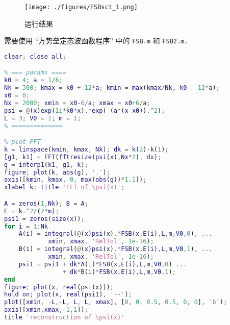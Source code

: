 
\begin{issues}
\issueDraft
{}
\end{issues}


\begin{figure}[ht]
\centering
\texttt{[image: ./figures/FSBsct\_1.png]}
\caption{运行结果} \label{FSBsct_fig1}
\end{figure}

需要使用 “方势垒定态波函数程序” 中的 \verb|FSB.m| 和 \verb|FSB2.m|．
\begin{lstlisting}[language=matlab, caption=FSBsct.m]
% 使用类 sin，cos 基底
clear; close all;

% === params ====
k0 = 4; a = 1/6;
Nk = 300; kmax = k0 + 12*a; kmin = max(kmax/Nk, k0 - 12*a);
x0 = 0;
Nx = 2000; xmin = x0-6/a; xmax = x0+6/a;
psi = @(x)exp(1i*k0*x).*exp(-(a*(x-x0)).^2);
L = 3; V0 = 1; m = 1;
% ==============

% plot FFT
k = linspace(kmin, kmax, Nk); dk = k(2)-k(1);
[g1, k1] = FFT(fftresize(psi(x),Nx*2), dx);
g = interp1(k1, g1, k);
figure; plot(k, abs(g), '.');
axis([kmin, kmax, 0, max(abs(g))*1.1]);
xlabel k; title 'FFT of \psi(x)';

A = zeros(1,Nk); B = A;
E = k.^2/(2*m);
psi1 = zeros(size(x));
for i = 1:Nk
    A(i) = integral(@(x)psi(x).*FSB(x,E(i),L,m,V0,0), ...
            xmin, xmax, 'RelTol', 1e-16);
    B(i) = integral(@(x)psi(x).*FSB(x,E(i),L,m,V0,1), ...
            xmin, xmax, 'RelTol', 1e-16);
    psi1 = psi1 + dk*A(i)*FSB(x,E(i),L,m,V0,0) ...
                + dk*B(i)*FSB(x,E(i),L,m,V0,1);
end
figure; plot(x, real(psi(x)));
hold on; plot(x, real(psi1), '--');
plot([xmin, -L,-L, L, L, xmax], [0, 0, 0.5, 0.5, 0, 0], 'b');
axis([xmin,xmax,-1,1]);
title 'reconstruction of \psi(x)'
\end{lstlisting}

